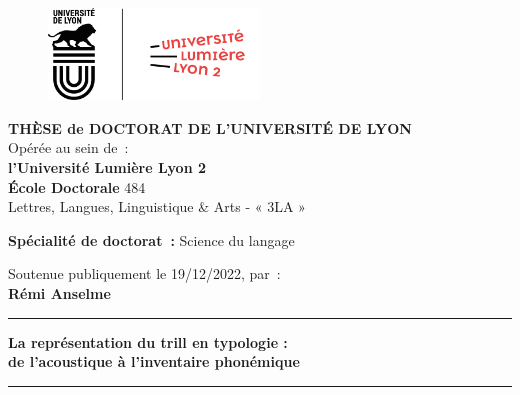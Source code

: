 
\begin{titlepage}

\begin{singlespace} 	
	\unitlength 1cm
	\begin{center}
		
		\vspace*{-0.25cm}
		\begin{figure}[h]
			\centering
			\includegraphics[width=0.5\textwidth]{logos}
		\end{figure}
		
		
		
		{\large \bf THÈSE de DOCTORAT DE L'UNIVERSITÉ DE LYON\\}
		{Opérée au sein de~:\\}
		{\large \bf l'Université Lumière Lyon 2\\}
		\vspace{12pt}
		{\large \textbf{École Doctorale} 484 \\Lettres, Langues, Linguistique \& Arts - « 3LA »}
		
		
		\vspace{12pt}
		
		{\large \textbf{Spécialité de doctorat~:} Science du langage \\}
		
		\vspace{0.8cm}
		
		{Soutenue publiquement le 19/12/2022, par~:\\}
		{\Large\bf {Rémi Anselme}}
		\vspace{0.5cm}           
		
		
		\rule{5cm}{1pt}
		
		\vspace{12pt}
		
		{\LARGE \bf La représentation du trill en typologie :}\\
		\vspace{0.3cm}
		{\Large \bf de l'acoustique à l’inventaire phonémique}
		
		\vspace{12pt}
		\rule{5cm}{1pt}
		

\end{center}
\end{singlespace}
\end{titlepage}
